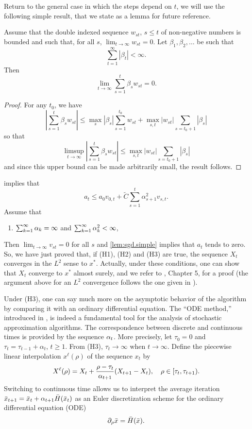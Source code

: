 Return to the general case in which the steps depend on $t$, we will  use the following simple result, that we state as a lemma for future reference.
\begin{lemma}
\label{lem:sgd.simple}
Assume that the double indexed sequence $w_{st}$, $s\leq t$ of non-negative numbers is bounded and such that, for all $s$, $\lim_{t\to \infty} w_{st} = 0$. Let $\beta_1, \beta_2, \ldots$ be such that
\[
\sum_{t=1}^\infty |\beta_t| < \infty.
\]
Then
\[
\lim_{t \to \infty} \sum_{s=1}^t \beta_s w_{st} = 0.
\]
\end{lemma}
\begin{proof}
For any $t_0$, we have
\[
\left|\sum_{s=1}^t \beta_s w_{st}\right| \leq \max_{s} |\beta_s| \sum_{s=1}^{t_0}  w_{st} + \max_{s,t} |w_{st}| \sum_{s=t_0+1} |\beta_s|
\]
so that
\[
\limsup_{t\to \infty} \left|\sum_{s=1}^t \beta_s w_{st}\right| \leq \max_{s,t} |w_{st}| \sum_{s=t_0+1} |\beta_s|
\]
and since this upper bound can be made arbitrarily small, the result follows. 
\end{proof}

 implies that 
\[
a_t \leq a_0 v_{0,t} + \tilde C \sum_{s=1}^t \alpha^2_{s+1} v_{s,t}.
\]
Assume that 
\begin{enumerate}[label=(H3)]
\item $\sum_{k=1}^\infty \alpha_k = \infty$ and $\sum_{k=1}^\infty \alpha_k^2 < \infty$,
\end{enumerate} 
Then $\lim_{t\to\infty} v_{st} = 0$ for all $s$ and \cref{lem:sgd.simple} implies that $a_t$ tends to zero. So, we have just proved that, if (H1), (H2) and (H3) are true,
the sequence $X_t$ converges in the $L^2$ sense to $x^*$. Actually, under these conditions, one can show that $X_t$ converge to $x^*$ almost surely, and we refer to \citet{benveniste2012adaptive}, Chapter 5, for a proof (the argument above for an $L^2$ convergence follows the one given in \citet{nemirovski_robust_2009}).

\bigskip

Under (H3), one can say much more on the asymptotic behavior of the algorithm by comparing it with an ordinary differential equation. The ``ODE method,'' introduced in \citet{ljung1977analysis}, is indeed a fundamental tool for the analysis of stochastic approximation algorithms. The correspondence between discrete and continuous times is provided by the sequence $\alpha_t$.  More precisely, let $\tau_0=0$ and $\tau_{t} =  \tau_{t-1} + \alpha_t$, $t\geq 1$. From (H3), $\tau_t \to \infty$ when $t\to\infty$. Define the piecewise linear interpolation $x^\ell(\rho)$ of the sequence $x_t$  by 
\[
X^\ell(\rho) = X_t +  \frac{\rho-\tau_t}{\alpha_{t+1}} (X_{t+1} - X_t),\quad  \rho\in [\tau_{t}, \tau_{t+1}).
\] 
Switching to continuous time allows us to interpret the average iteration $\bar x_{t+1} = \bar x_t + \alpha_{t+1} \bar H(\bar x_t) $ as an Euler discretization scheme for the ordinary differential equation (ODE)
\begin{equation}
\label{eq:sa.ode}
\partial_\rho \bar x = \bar H(\bar x).
\end{equation}

